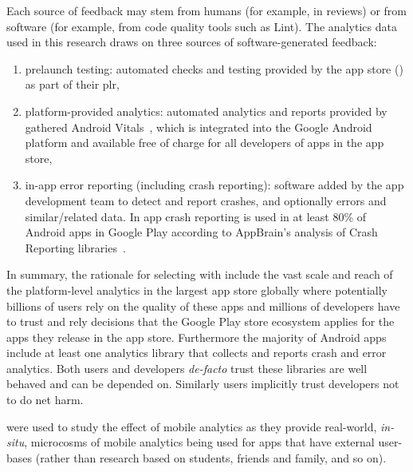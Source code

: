 Each source of feedback may stem from humans (for example, in reviews) or from software (for example, from code quality tools such as Lint). The analytics data used in this research draws on three sources of software-generated feedback:
\begin{enumerate}
    \item prelaunch testing: automated checks and testing provided by the app store () as part of their \gls{plr},
    \item platform-provided analytics: automated analytics and reports provided by gathered Android Vitals~, which is integrated into the Google Android platform and available free of charge for all developers of apps in the  app store,
    \item in-app error reporting (including crash reporting): software added by the app development team to detect and report crashes, and optionally errors and similar/related data. In app crash reporting is used in at least 80\% of Android apps in Google Play according to AppBrain's analysis of Crash Reporting libraries~.
\end{enumerate}


In summary, the rationale for selecting  with  include the vast scale and reach of the platform-level analytics in the largest app store globally where potentially billions of users rely on the quality of these apps and millions of developers have to trust and rely decisions that the Google Play store ecosystem applies for the apps they release in the app store. Furthermore the majority of Android apps include at least one analytics library that collects and reports crash and error analytics. Both users and developers \emph{de-facto} trust these libraries are well behaved and can be depended on. Similarly users implicitly trust developers not to do net harm. 

 were used to study the effect of mobile analytics as they provide real-world, \emph{in-situ}, microcosms of mobile analytics being used for apps that have external user-bases (rather than research based on students, friends and family, and so on). 

